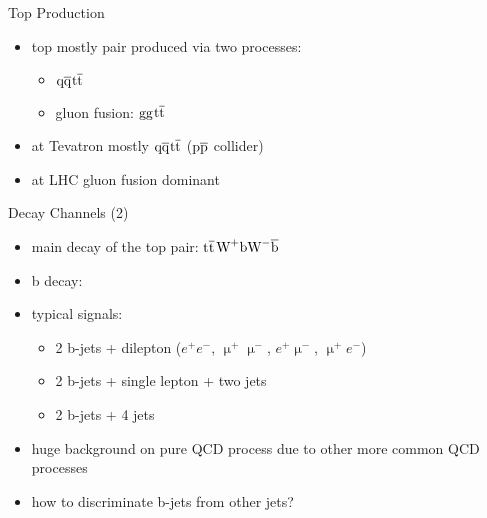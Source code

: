 \begin{frame}{Top Production}

	\begin{itemize}\itemfill
		\item top mostly pair produced via two processes:
		\begin{itemize}
			\item $\text{q}\overline{\text{q}}$\ch{->}$\text{t}\overline{\text{t}}$
			\item gluon fusion: $\text{g}\text{g}$\ch{->}$\text{t}\overline{\text{t}}$
		\end{itemize}
	\end{itemize}
	
	\begin{figure}\vspace*{-10pt}
		\centering
	\end{figure}\vspace*{-10pt}
	
	\begin{itemize}\itemfill
		\item at Tevatron mostly $\text{q}\overline{\text{q}}$\ch{->}$\text{t}\overline{\text{t}}$ (\ra $\text{p}\overline{\text{p}}$ collider)
		\item at LHC gluon fusion dominant
	\end{itemize}

\end{frame}
\begin{frame}{Decay Channels (2)}

	\begin{itemize}\itemfill 
		\item main decay of the top pair: $\text{t}\overline{\text{t}}$\ch{->}$\text{W}^+\text{b}\text{W}^-\overline{\text{b}}$
		\item b decay:
	\end{itemize}
	
	\begin{figure}\vspace*{-10pt}
		\centering
		\hspace*{10pt}
	\end{figure}
	
	\begin{itemize}\itemfill
		\item typical signals:
		\begin{itemize}
			\item 2 b-jets + dilepton ($e^+e^-$, $\upmu^+\upmu^-$, $e^+\upmu^-$, $\upmu^+e^-$)
			\item 2 b-jets + single lepton + two jets
			\item 2 b-jets + 4 jets
		\end{itemize}
		\item huge background on pure QCD process due to other more common QCD processes
		\item how to discriminate b-jets from other jets?
	\end{itemize}

\end{frame}
